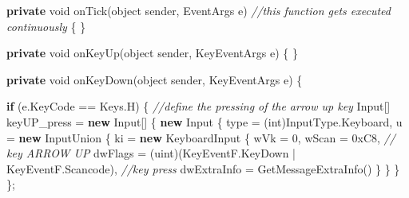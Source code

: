 \documentclass[
  openany]{book}
\newenvironment{Shaded}{\begin{snugshade}}{\end{snugshade}}
\newcommand{\BaseNTok}[1]{\textcolor[rgb]{0.00,0.00,0.81}{#1}}
\newcommand{\CommentTok}[1]{\textcolor[rgb]{0.56,0.35,0.01}{\textit{#1}}}
\newcommand{\DataTypeTok}[1]{\textcolor[rgb]{0.13,0.29,0.53}{#1}}
\newcommand{\DecValTok}[1]{\textcolor[rgb]{0.00,0.00,0.81}{#1}}
\newcommand{\FunctionTok}[1]{\textcolor[rgb]{0.00,0.00,0.00}{#1}}
\newcommand{\KeywordTok}[1]{\textcolor[rgb]{0.13,0.29,0.53}{\textbf{#1}}}
\newcommand{\NormalTok}[1]{#1}
\begin{document}
\begin{Shaded}
\begin{Highlighting}[]
        \KeywordTok{private} \DataTypeTok{void} \FunctionTok{onTick}\NormalTok{(}\DataTypeTok{object}\NormalTok{ sender, EventArgs e) }\CommentTok{//this function gets executed continuously }
\NormalTok{        \{}
\NormalTok{        \}}

        \KeywordTok{private} \DataTypeTok{void} \FunctionTok{onKeyUp}\NormalTok{(}\DataTypeTok{object}\NormalTok{ sender, KeyEventArgs e)}
\NormalTok{        \{}
\NormalTok{        \}}

        \KeywordTok{private} \DataTypeTok{void} \FunctionTok{onKeyDown}\NormalTok{(}\DataTypeTok{object}\NormalTok{ sender, KeyEventArgs e)}
\NormalTok{        \{}
            
            \KeywordTok{if}\NormalTok{ (e.}\FunctionTok{KeyCode}\NormalTok{ == Keys.}\FunctionTok{H}\NormalTok{)}
\NormalTok{            \{   }
                \CommentTok{//define the pressing of the arrow up key}
\NormalTok{                Input[] keyUP_press = }\KeywordTok{new}\NormalTok{ Input[]}
\NormalTok{                \{}
                  \KeywordTok{new}\NormalTok{ Input}
\NormalTok{                  \{}
\NormalTok{                    type = (}\DataTypeTok{int}\NormalTok{)InputType.}\FunctionTok{Keyboard}\NormalTok{,}
\NormalTok{                    u = }\KeywordTok{new}\NormalTok{ InputUnion}
\NormalTok{                    \{}
\NormalTok{                      ki = }\KeywordTok{new}\NormalTok{ KeyboardInput}
\NormalTok{                      \{}
\NormalTok{                        wVk = }\DecValTok{0}\NormalTok{,}
\NormalTok{                        wScan = }\BaseNTok{0xC8}\NormalTok{, }\CommentTok{// key ARROW UP}
\NormalTok{                        dwFlags = (}\DataTypeTok{uint}\NormalTok{)(KeyEventF.}\FunctionTok{KeyDown}\NormalTok{ | KeyEventF.}\FunctionTok{Scancode}\NormalTok{), }\CommentTok{//key press}
\NormalTok{                        dwExtraInfo = }\FunctionTok{GetMessageExtraInfo}\NormalTok{()}
\NormalTok{                      \}}
\NormalTok{                    \}}
\NormalTok{                  \}}
\NormalTok{                \};}


\end{Highlighting}
\end{Shaded}
\end{document}
